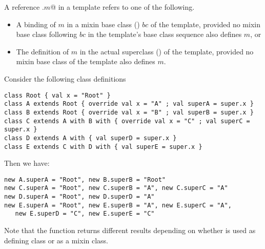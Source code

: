 \documentclass[11pt]{report}
\newcommand{\ifqualified}[1]{}
\begin{document}
A reference \verb@super.$m$@ in a template refers to one of the
following.
\begin{itemize}
\item
A binding of $m$ in a mixin base class () $bc$
of the template, provided no mixin base class following $bc$ in the template's base class sequence also defines $m$, or
\item
The definition of $m$ in the actual superclass
() of the template, provided no
mixin base class of the template also
defines $m$.
\end{itemize}


\example\label{ex:super}
Consider the following class definitions

\begin{verbatim}
class Root { val x = "Root" }
class A extends Root { override val x = "A" ; val superA = super.x }
class B extends Root { override val x = "B" ; val superB = super.x }
class C extends A with B with { override val x = "C" ; val superC = super.x }
class D extends A with { val superD = super.x }
class E extends C with D with { val superE = super.x }
\end{verbatim}
Then we have:
\begin{verbatim}
new A.superA = "Root", new B.superB = "Root"
new C.superA = "Root", new C.superB = "A", new C.superC = "A"
new D.superA = "Root", new D.superD = "A"
new E.superA = "Root", new E.superB = "A", new E.superC = "A",
   new E.superD = "C", new E.superE = "C"
\end{verbatim}
Note that the \verb@superB@ function returns different results
depending on whether \verb@B@ is used as defining class or as a mixin class.

\ifqualified{
\example\label{ex:qualified-super}
Consider the class definitions
\begin{verbatim}
qualified class C with { def f: String = "C" }
qualified class D with { def f: String = "D" }
\end{verbatim}
Here is a subclass of \verb@C@ and \verb@D@ which overrides both
versions of \verb@f@ and invokes both previous definitions via \verb@super@:
\begin{verbatim}
class B extends C with D with {
  override C def f = (super:C).f ++ "B"
  override D def f = (super:D).f ++ "B"
}
\end{verbatim}
}
\end{document}
